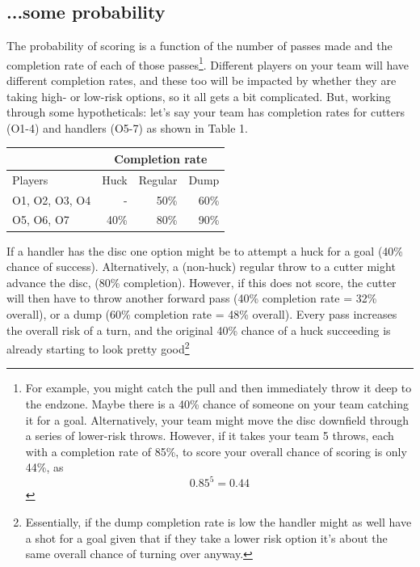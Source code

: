 \documentclass{tufte-handout}
\begin{document}
\subsection{...some probability}
\label{sec:probability}
The probability 
of scoring  
is a function of 
the number of passes made 
and the completion rate of 
each of those passes\footnote{
For example, 
you might catch the pull 
and then immediately 
throw it deep 
to the endzone.
Maybe there is a 
40\% chance 
of someone on your team 
catching it for a goal. 
Alternatively, 
your team might 
move the disc 
downfield 
through a series of 
lower-risk throws.  
However, if it takes 
your team  
5 throws, 
each with a completion 
rate of 85\%, 
to score
your overall chance 
of scoring is only 44\%, 
as 
\begin{equation} 0.85^5 = 0.44 \end{equation}
}. 
Different players 
on your team 
will have 
different completion rates, 
and these too 
will be impacted by 
whether they are 
taking high- or low-risk 
options, 
so it all gets a bit complicated.
But, 
working through 
some hypotheticals:
let's say your team
has completion rates for 
cutters (O1-4) 
and handlers (O5-7) 
as shown in Table 1.  


\begin{margintable}
\caption{Completion rates 1}
\begin{tabular}{|l|r r r|}
\hline
 & \multicolumn{3}{|c|}{Completion rate} \\
 \hline
Players & Huck & Regular & Dump \\
O1, O2, O3, O4 & - & 50\% & 60\% \\
O5, O6, O7 & 40\% & 80\% & 90\%\\
\hline
\end{tabular}
\end{margintable}

If a handler has the disc 
one option 
might be 
to attempt 
a huck  for a goal 
(40\% chance of 
success).  
Alternatively, a 
(non-huck) 
regular throw 
to a cutter 
might advance the disc, 
(80\% completion). 
However, if this
does not score, 
the cutter 
will then have to 
throw another forward pass 
(40\% completion rate = 32\% overall),
or a dump (60\% completion rate = 48\% overall). 
Every pass increases 
the overall risk of a turn, 
and the original 
40\% chance
of a huck succeeding 
is already starting to look pretty good\footnote{
Essentially, if the 
dump completion 
rate is low the handler 
might as well 
have a shot for 
a goal 
given that if they take 
a lower risk option 
it's about the same overall chance 
of turning over anyway.} 
\end{document}
